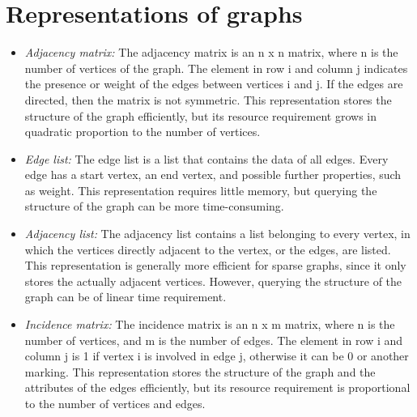 \documentclass[margin=0px]{article}
\begin{document}
\section{Representations of graphs}
\begin{itemize}
    \item \textit{Adjacency matrix:} The adjacency matrix is an n x n matrix, where n is the number of vertices of the graph. The element in row i and column j indicates the presence or weight of the edges between vertices i and j. If the edges are directed, then the matrix is not symmetric. This representation stores the structure of the graph efficiently, but its resource requirement grows in quadratic proportion to the number of vertices.
    \item \textit{Edge list:} The edge list is a list that contains the data of all edges. Every edge has a start vertex, an end vertex, and possible further properties, such as weight. This representation requires little memory, but querying the structure of the graph can be more time-consuming.
    \item \textit{Adjacency list:} The adjacency list contains a list belonging to every vertex, in which the vertices directly adjacent to the vertex, or the edges, are listed. This representation is generally more efficient for sparse graphs, since it only stores the actually adjacent vertices. However, querying the structure of the graph can be of linear time requirement.
    \item \textit{Incidence matrix:} The incidence matrix is an n x m matrix, where n is the number of vertices, and m is the number of edges. The element in row i and column j is 1 if vertex i is involved in edge j, otherwise it can be 0 or another marking. This representation stores the structure of the graph and the attributes of the edges efficiently, but its resource requirement is proportional to the number of vertices and edges.
\end{itemize}
\end{document}

